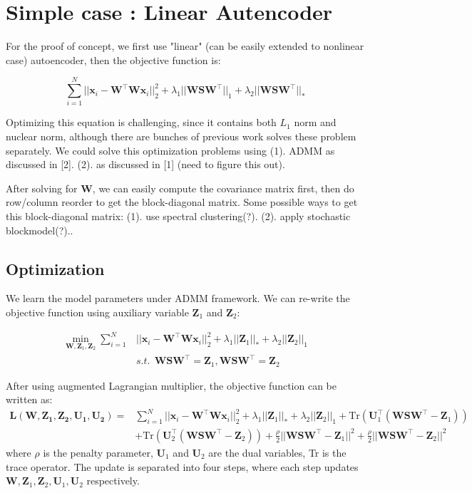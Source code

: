 \documentclass{article} %
\begin{document}
\section{Simple case : Linear Autencoder}
For the proof of concept, we first use "linear" (can be easily extended to nonlinear case) autoencoder, then the objective function is:

\begin{equation}
\sum_{i=1}^{N}||\mathbf{x}_i-\mathbf{W}^{\top}\mathbf{W}\mathbf{x}_i||_2^2 + \lambda_1||\mathbf{W}\mathbf{S}\mathbf{W}^\top||_1 + \lambda_2||\mathbf{W}\mathbf{S}\mathbf{W}^\top||_*
\end{equation}

Optimizing this equation is challenging, since it contains both $L_1$ norm and nuclear norm, although there are bunches of previous work solves these problem separately. We could solve this optimization problems using  (1). ADMM as discussed in [2]. (2). as discussed in [1] (need to figure this out).


After solving for $\mathbf{W}$, we can easily compute the covariance matrix first, then do row/column reorder to get the block-diagonal matrix. Some possible ways to get this block-diagonal matrix: (1). use spectral clustering(?). (2). apply stochastic blockmodel(?)..


\subsection{Optimization}
We learn the model parameters under ADMM framework. We can re-write the objective function using auxiliary variable $\mathbf{Z}_1$ and $\mathbf{Z}_2$:

\begin{align}
\min_{\mathbf{W}, \mathbf{Z}_1, \mathbf{Z}_2} \sum_{i=1}^{N}&||\mathbf{x}_i-\mathbf{W}^{\top}\mathbf{W}\mathbf{x}_i||_2^2 + \lambda_1 ||\mathbf{Z}_1||_* + \lambda_2||\mathbf{Z}_2||_1  \\
&s.t.~~ \mathbf{W}\mathbf{S}\mathbf{W}^\top = \mathbf{Z}_1, \mathbf{W}\mathbf{S}\mathbf{W}^\top = \mathbf{Z}_2\nonumber
\end{align}

After using augmented Lagrangian multiplier, the objective function can be written as:
\begin{align}
\mathbf{L(\mathbf{W}, \mathbf{Z}_1, \mathbf{Z}_2, \mathbf{U}_1, \mathbf{U}_2)} =& \sum_{i=1}^{N}||\mathbf{x}_i-\mathbf{W}^{\top}\mathbf{W}\mathbf{x}_i||_2^2 + \lambda_1 ||\mathbf{Z}_1||_* + \lambda_2||\mathbf{Z}_2||_1 + 
\text{Tr}(\mathbf{U}_1^{\top}(\mathbf{W}\mathbf{S}\mathbf{W}^\top-\mathbf{Z}_1)) \nonumber \\
&+\text{Tr}(\textbf{U}_2^{\top}(\mathbf{W}\mathbf{S}\mathbf{W}^\top-\mathbf{Z}_2)) + \frac{\rho}{2}||\mathbf{W}\mathbf{S}\mathbf{W}^\top-\mathbf{Z}_1||^2 + \frac{\rho}{2}||\mathbf{W}\mathbf{S}\mathbf{W}^\top-\mathbf{Z}_2||^2
\end{align}
where $\rho$ is the penalty parameter, $\mathbf{U}_1$ and $\mathbf{U}_2$ are the dual variables, Tr is the trace operator.
The update is separated into four steps, where each step updates $\mathbf{W}, \mathbf{Z}_1, \mathbf{Z}_2, \mathbf{U}_1, \mathbf{U}_2$ respectively.
\end{document}

